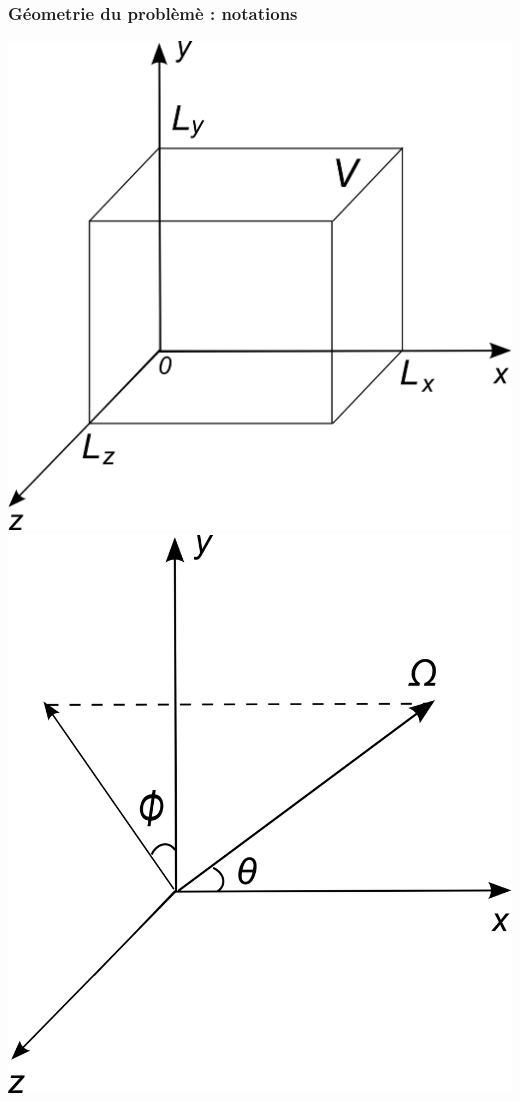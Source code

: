 \begin{frame}
\frametitle{Géometrie du problèmè : notations}
\includegraphics[scale=0.5]{Figures/cube_seme.png}\hspace{1cm}
\includegraphics[scale=0.45]{Figures/vitesse_seme.png}
\end{frame}

